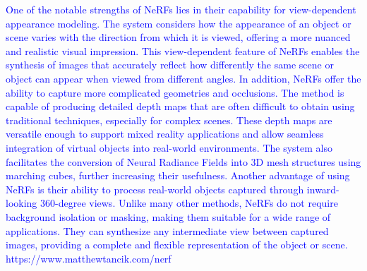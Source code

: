\textcolor{blue}{One of the notable strengths of NeRFs lies in their capability for view-dependent appearance modeling. The system considers how the appearance of an object or scene varies with the direction from which it is viewed, offering a more nuanced and realistic visual impression. This view-dependent feature of NeRFs enables the synthesis of images that accurately reflect how differently the same scene or object can appear when viewed from different angles. In addition, NeRFs offer the ability to capture more complicated geometries and occlusions. The method is capable of producing detailed depth maps that are often difficult to obtain using traditional techniques, especially for complex scenes. These depth maps are versatile enough to support mixed reality applications and allow seamless integration of virtual objects into real-world environments. The system also facilitates the conversion of Neural Radiance Fields into 3D mesh structures using marching cubes, further increasing their usefulness. Another advantage of using NeRFs is their ability to process real-world objects captured through inward-looking 360-degree views. Unlike many other methods, NeRFs do not require background isolation or masking, making them suitable for a wide range of applications. They can synthesize any intermediate view between captured images, providing a complete and flexible representation of the object or scene.
https://www.matthewtancik.com/nerf}